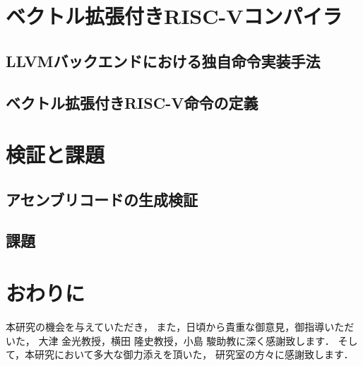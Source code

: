 \documentclass[a4paper,11pt,fleqn]{jbook}
\begin{document}
\newpage
\chapter{ベクトル拡張付きRISC-Vコンパイラ}
\label{chp:4}

\section{LLVMバックエンドにおける独自命令実装手法}
\label{chp:4_1}

\section{ベクトル拡張付きRISC-V命令の定義}
\label{chp:4_2}



\newpage
\chapter{検証と課題}
\label{chp:5}

\section{アセンブリコードの生成検証}
\label{chp:5_1}

\section{課題}
\label{chp:5_2}


\newpage
\chapter{おわりに}
\label{chp:outro}


\newpage
\acknowledgement
本研究の機会を与えていただき，
また，日頃から貴重な御意見，御指導いただいた，
大津 金光教授，横田 隆史教授，小島 駿助教に深く感謝致します．
そして，本研究において多大な御力添えを頂いた，
研究室の方々に感謝致します．


\endacknowledgement

\newpage
{}

\endthebibliography
\end{document}
